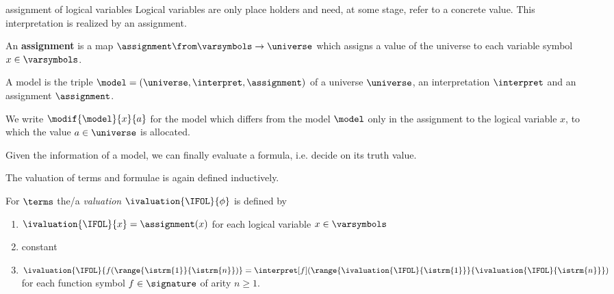 




            assignment of logical variables
            Logical variables are only place holders and need, at some stage, refer to a concrete value. This interpretation is realized by an assignment.

            \begin{definition}[Assignment]
                An \textbf{assignment} is a map $\assignment\from\varsymbols\to\universe$ which assigns a value of the universe to each variable symbol $x\in\varsymbols$.
            \end{definition}

            \begin{definition}[Model]
                A model is the triple $\model=(\universe,\interpret,\assignment)$ of a universe $\universe$, an interpretation $\interpret$ and an assignment $\assignment$.
            \end{definition}

            We write $\modif{\model}{x}{a}$ for the model which differs from the model $\model$ only in the assignment to the logical variable $x$, to which the value $a\in\universe$ is allocated.

            Given the information of a model, we can finally evaluate a formula, i.e. decide on its truth value.

            The valuation of terms and formulae is again defined inductively.
            \begin{definition}
                For $\terms$ the/a \emph{valuation} $\ivaluation{\IFOL}{\phi}$ is defined by
                \begin{enumerate}
                    \item $\ivaluation{\IFOL}{x} = \assignment(x)$ for each logical variable $x\in\varsymbols$
                    \item constant
                    \item $\ivaluation{\IFOL}{f(\range{\istrm{1}}{\istrm{n}})} = \interpret[f](\range{\ivaluation{\IFOL}{\istrm{1}}}{\ivaluation{\IFOL}{\istrm{n}}})$ for each function symbol $f\in\signature$ of arity $n\geq 1$.
                \end{enumerate}
            \end{definition}


